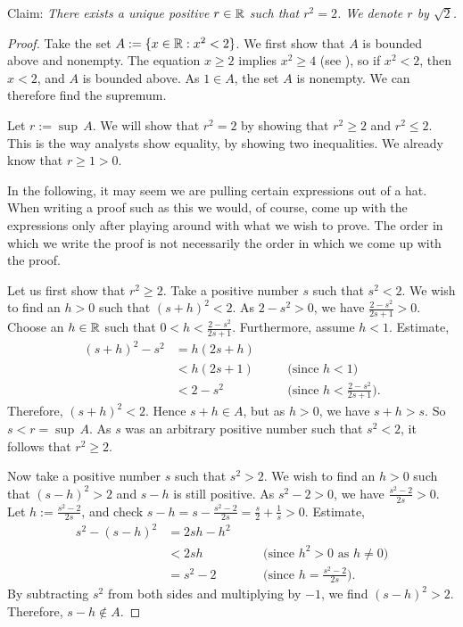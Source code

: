\begin{example} \label{example:sqrt2}
Claim: \emph{There exists a unique positive
$r \in {\mathbb{R}}$ such that $r^2 = 2$.  We denote $r$ by $\sqrt{2}$.}

\begin{proof}
Take the set
$A := \{ x \in {\mathbb{R}} : x^2 < 2 \}$.  We first show that $A$ is bounded above and
nonempty.  The equation $x \geq 2$ implies $x^2 \geq 4$
(see ), so
if $x^2 < 2$, then $x < 2$, and $A$ is bounded above.
As $1 \in A$, the set $A$ is nonempty.  We can therefore find the supremum.

Let $r := \sup\, A$.  We will show that $r^2 = 2$ by showing
that $r^2 \geq 2$ and $r^2 \leq 2$.  This is the way analysts show
equality, by showing two inequalities.
We already know that $r \geq 1 > 0$.

In the following, it may seem we are pulling certain expressions out of
a hat.  When writing a proof such as this we would, of course, come up with
the expressions only after playing around with what we wish to prove.  The
order in which we write the proof is not necessarily the order in which we
come up with the proof.

Let us first show that $r^2 \geq 2$.
Take a positive number $s$ such that $s^2 < 2$.  We wish to find an $h > 0$
such that ${(s+h)}^2 < 2$.
As $2-s^2 > 0$, we have $\frac{2-s^2}{2s+1} > 0$.
Choose an $h \in {\mathbb{R}}$ such that
$0 < h < \frac{2-s^2}{2s+1}$.
Furthermore, assume $h < 1$.  Estimate,
\begin{equation*}
\begin{aligned}
{(s+h)}^2 - s^2 & = h(2s + h) \\
 & < h(2s+1) & & \quad \bigl(\text{since } h < 1\bigr) \\
 & < 2-s^2 & & \quad \bigl(\text{since } h < \tfrac{2-s^2}{2s+1} \bigr) .
\end{aligned}
\end{equation*}
Therefore, ${(s+h)}^2 < 2$.  Hence $s+h \in A$, but as $h > 0$,
we have $s+h > s$.  So $s < r = \sup\, A$.  As $s$ was an arbitrary
positive number such that $s^2 < 2$, it follows that $r^2 \geq 2$.


Now take a positive number $s$ such that
$s^2 > 2$.  We wish to find an $h > 0$ such that
${(s-h)}^2 > 2$ and $s-h$ is still positive.
As 
$s^2-2 > 0$, we have $\frac{s^2-2}{2s} > 0$.
Let $h := \frac{s^2-2}{2s}$,
and check
$s-h=s-\frac{s^2-2}{2s} = \frac{s}{2}+\frac{1}{s} > 0$.  Estimate,
\begin{equation*}
\begin{aligned}
s^2 - {(s-h)}^2 & = 2sh - h^2 \\
 & < 2sh & & \quad \bigl( \text{since } h^2 > 0 \text{ as } h \not= 0 \bigr)  \\
 & = s^2-2 & & \quad \bigl( \text{since } h = \tfrac{s^2-2}{2s} \bigr) .
\end{aligned}
\end{equation*}
By subtracting $s^2$ from both sides and multiplying by $-1$, we find
${(s-h)}^2 > 2$.  Therefore, $s-h \notin A$.


\end{proof}
\end{example}
